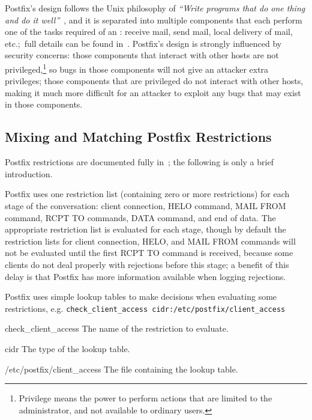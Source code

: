 Postfix's design follows the Unix philosophy of \textit{``Write programs
that do one thing and do it well''\/}~\cite{unix-philosophy}, and it is
separated into multiple components that each perform one of the tasks
required of an \@: receive mail, send mail, local delivery of
mail, etc.;\ full details can be found in~\cite{postfix-overview}.
Postfix's design is strongly influenced by security concerns: those
components that interact with other hosts are not
privileged,\footnote{Privilege means the power to perform actions that are
limited to the administrator, and not available to ordinary users.} so bugs
in those components will not give an attacker extra privileges; those
components that are privileged do not interact with other hosts, making it
much more difficult for an attacker to exploit any bugs that may exist in
those components.

\subsection{Mixing and Matching Postfix Restrictions}

\label{Mixing and matching Postfix restrictions}

Postfix restrictions are documented fully in~\cite{smtpd_access_readme,
smtpd_per_user_control, policy-servers}; the following is only a brief
introduction.

Postfix uses one restriction list (containing zero or more restrictions)
for each stage of the  conversation: client connection, HELO
command, MAIL FROM command, RCPT TO commands, DATA command, and end of
data.  The appropriate restriction list is evaluated for each stage, though
by default the restriction lists for client connection, HELO, and MAIL FROM
commands will not be evaluated until the first RCPT TO command is received,
because some clients do not deal properly with rejections before this
stage; a benefit of this delay is that Postfix has more information
available when logging rejections.

Postfix uses simple lookup tables to make decisions when evaluating some
restrictions, e.g.\newline{}
\tab{}\texttt{check\_client\_access~cidr:/etc/postfix/client\_access}

\begin{eqlist}

    \item [check\_client\_access] The name of the restriction to evaluate.

    \item [cidr] The type of the lookup table.

    \item [/etc/postfix/client\_access] The file containing the lookup
        table.

\end{eqlist}


